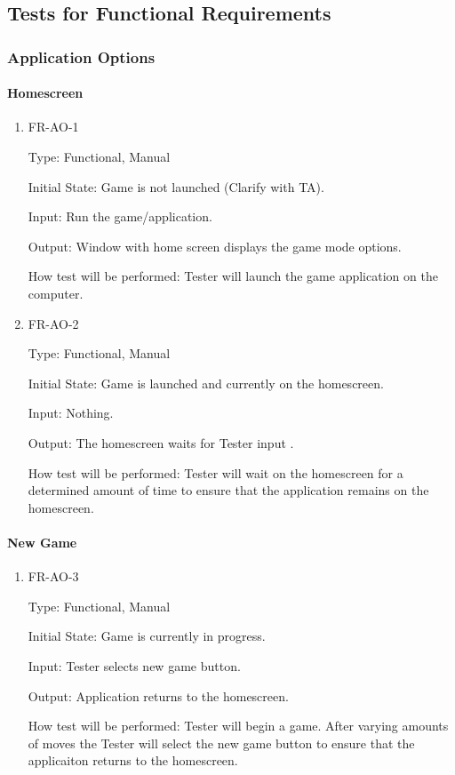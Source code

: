 \documentclass[12pt, titlepage]{article}
\begin{document}
\subsection{Tests for Functional Requirements}

\subsubsection{Application Options}
		
\paragraph{Homescreen}
\begin{enumerate}
    \item{FR-AO-1}
    
    Type: Functional, Manual
    
    Initial State: Game is not launched (Clarify with TA).
    					
    Input: Run the game/application.
    					
    Output: Window with home screen displays the game mode options.
    					
    How test will be performed: Tester will launch the game application on the computer. 
    \item{FR-AO-2}
    
    Type: Functional, Manual
    					
    Initial State: Game is launched and currently on the homescreen.
    					
    Input: Nothing.
    					
    Output: The homescreen waits for Tester input .
    					
    How test will be performed: Tester will wait on the homescreen for a determined amount of time to ensure that the application remains on the homescreen. 
\end{enumerate}

\paragraph{New Game}
\begin{enumerate}
    \item{FR-AO-3}
    
    Type: Functional, Manual
    
    Initial State: Game is currently in progress.
    					
    Input: Tester selects new game button.
    					
    Output: Application returns to the homescreen.
    					
    How test will be performed: Tester will begin a game. After varying amounts of moves the Tester will select the new game button to ensure that the applicaiton returns to the homescreen.
\end{enumerate}
\end{document}
